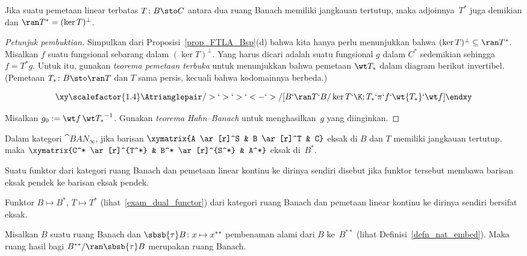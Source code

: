 \begin{prop} Jika suatu pemetaan linear terbatas $T\colon B \sto C$ antara dua ruang Banach memiliki jangkauan tertutup, maka
adjoinnya~$T^*$ juga demikian dan $\ran T^* = (\ker T)^\perp$.
\end{prop}

\begin{proof}[\emph{Petunjuk pembuktian}] Simpulkan dari Proposisi~\ref{prop_FTLA_Bsp}(d) bahwa kita hanya perlu menunjukkan bahwa
$(\ker T)^\perp \subseteq \ran T^*$. Misalkan $f$ suatu fungsional sebarang dalam $(\ker T)^\perp$. Yang harus dicari adalah suatu
fungsional $g$ dalam $C^*$ sedemikian sehingga $f = T^*g$. Untuk itu, gunakan \emph{teorema pemetaan terbuka} untuk menunjukkan bahwa pemetaan $\wt T_\ast$
dalam diagram berikut invertibel. (Pemetaan $T_\ast\colon B \sto \ran T$ dan $T$ sama persis, kecuali bahwa
kodomainnya berbeda.)

 \[\xy
    \scalefactor{1.4}%
    \Atrianglepair/>`>`>`<-`>/[B`\ran T`B/\ker T`\K;T_\ast`\pi`f`\wt{T_\ast}`\wt f]
 \endxy\]

Misalkan $g_0 := \wt f\,{\wt T_\ast}^{-1}$. Gunakan \emph{teorema Hahn--Banach} untuk menghasilkan~$g$ yang diinginkan.   \ns
\end{proof}

\begin{prop} Dalam kategori $\cat{BAN_\infty}$, jika barisan $\xymatrix{A \ar[r]^S & B \ar[r]^T & C}$ eksak di $B$
dan $T$ memiliki jangkauan tertutup, maka $\xymatrix{C^* \ar[r]^{T^*} & B^* \ar[r]^{S^*} & A^*}$ eksak di~$B^*$.
\end{prop}

\begin{defn} Suatu funktor dari kategori ruang Banach dan pemetaan linear kontinu ke dirinya sendiri disebut
 jika funktor tersebut membawa barisan eksak pendek ke barisan eksak pendek.
\end{defn}

\begin{exam}\label{exam_dualfunctor_exact} Funktor $B \mapsto B^*$, $T \mapsto T^*$ (lihat~\ref{exam_dual_functor})
dari kategori ruang Banach dan pemetaan linear kontinu ke dirinya sendiri bersifat eksak.
\end{exam}

\begin{exam} Misalkan $B$ suatu ruang Banach dan $\sbsb{\tau}B\colon x \mapsto x^{**}$ pembenaman alami dari $B$ ke~$B^{**}$
(lihat Definisi~\ref{defn_nat_embed}). Maka ruang hasil bagi $B^{**}/\ran\sbsb{\tau}B$ merupakan ruang Banach.
\end{exam}

